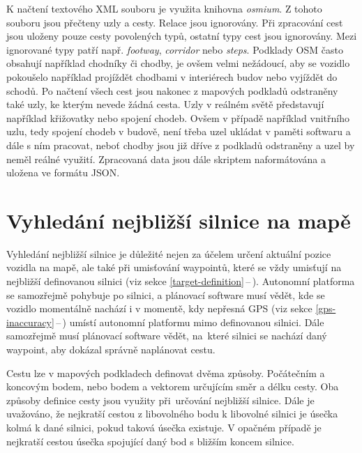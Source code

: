 \documentclass[czech, bachelor]{diploma}
\newcommand{\peteref}[1]{\ref{#1}\,--\,\nameref{#1}}
\begin{document}
K načtení textového XML souboru je využita knihovna \emph{osmium}. Z tohoto souboru jsou přečteny uzly a cesty. Relace jsou
ignorovány. Při zpracování cest jsou uloženy pouze cesty povolených typů, ostatní typy cest jsou ignorovány. Mezi ignorované typy
patří např. \emph{footway}, \emph{corridor} nebo \emph{steps}. Podklady OSM často obsahují například chodníky či chodby, je ovšem
velmi nežádoucí, aby se vozidlo pokoušelo například projíždět chodbami v interiérech budov nebo vyjíždět do schodů. Po načtení
všech cest jsou nakonec z mapových podkladů odstraněny také uzly, ke kterým nevede žádná cesta. Uzly v reálném světě představují
například křižovatky nebo spojení chodeb. Ovšem v případě například vnitřního uzlu, tedy spojení chodeb v budově, není třeba uzel
ukládat v paměti softwaru a dále s ním pracovat, neboť chodby jsou již dříve z podkladů odstraněny a uzel by neměl reálné využití.
Zpracovaná data jsou dále skriptem naformátována a uložena ve formátu JSON.

\section{Vyhledání nejbližší silnice na mapě}

Vyhledání nejbližší silnice je důležité nejen za účelem určení aktuální pozice vozidla na mapě, ale také při umisťování waypointů,
které se vždy umisťují na nejbližší definovanou silnici (viz sekce \peteref{target-definition}). Autonomní platforma
se samozřejmě pohybuje po silnici, a plánovací software musí vědět, kde se vozidlo momentálně nachází i v momentě, kdy nepřesná
GPS (viz sekce \peteref{gps-inaccuracy}) umístí autonomní platformu mimo definovanou silnici. Dále samozřejmě musí plánovací
software vědět, na~které silnici se nachází daný waypoint, aby dokázal správně naplánovat cestu.

Cestu lze v mapových podkladech definovat dvěma způsoby. Počátečním a koncovým bodem, nebo bodem a vektorem určujícím směr a délku
cesty. Oba způsoby definice cesty jsou využity při~určování nejbližší silnice. Dále je uvažováno, že nejkratší cestou
z libovolného bodu k libovolné silnici je úsečka kolmá k dané silnici, pokud taková úsečka existuje. V opačném případě
je nejkratší cestou úsečka spojující daný bod s bližším koncem silnice.
\end{document}
